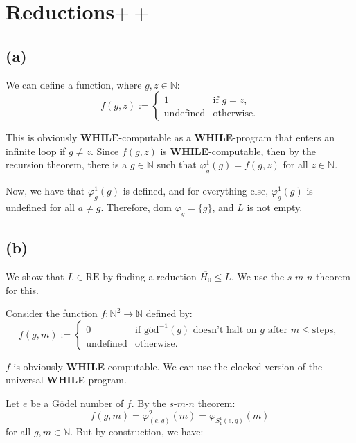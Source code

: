 

\setcounter{section}{1}


\section{Reductions$++$}

\subsection{(a)}

We can define a function, where $g, z \in \mathbb{N}$:
\[
f(g, z) :=
\begin{cases}
    1 & \text{if } g = z, \\
    \text{undefined} & \text{otherwise}.
\end{cases}
\]

This is obviously \textbf{WHILE}-computable as a \textbf{WHILE}-program that enters an infinite loop if $g \neq z$. Since $f(g, z)$ is \textbf{WHILE}-computable, then by the recursion theorem, there is a $g \in \mathbb{N}$ such that $\varphi^1_g(g) = f(g, z)$ for all $z \in \mathbb{N}$.

Now, we have that $\varphi^1_g(g)$ is defined, and for everything else, $\varphi^1_g(g)$ is undefined for all $a \neq g$. Therefore, $\text{dom } \varphi_g = \{g\}$, and $L$ is not empty.


\subsection{(b)}

We show that $L \in \text{RE}$ by finding a reduction $\overline{H_0} \leq L$. We use the $s$-$m$-$n$ theorem for this.

Consider the function $f: \mathbb{N}^2 \to \mathbb{N}$ defined by:
\[
f(g, m) :=
\begin{cases}
    0 & \text{if } \text{göd}^{-1}(g) \text{ doesn't halt on } g \text{ after } m \leq \text{steps}, \\
    \text{undefined} & \text{otherwise}.
\end{cases}
\]

$f$ is obviously \textbf{WHILE}-computable. We can use the clocked version of the universal \textbf{WHILE}-program.

Let $e$ be a Gödel number of $f$. By the $s$-$m$-$n$ theorem:
\[
f(g, m) = \varphi^2_{(e, g)}(m) = \varphi_{S^1_1(e, g)}(m)
\]
for all $g, m \in \mathbb{N}$. But by construction, we have:

